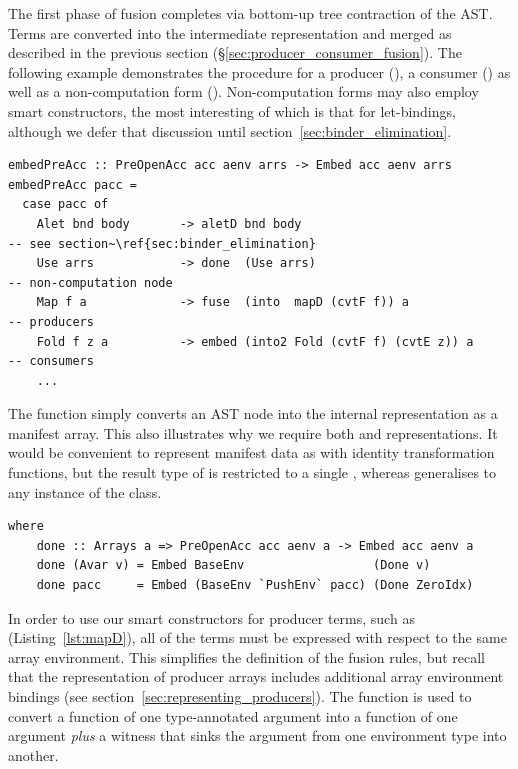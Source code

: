 The first phase of fusion completes via bottom-up tree contraction of the
AST. Terms are converted into the intermediate
representation and merged as described in the previous section
(\S\ref{sec:producer_consumer_fusion}). The following example demonstrates the
procedure for a producer (), a consumer () as well as a
non-computation form (). Non-computation forms may also employ smart
constructors, the most interesting of which is that for let-bindings, although
we defer that discussion until section~\ref{sec:binder_elimination}.
%
\begin{lstlisting}[style=haskell
    ,name=embedPreAcc
    ,label=lst:embedPreAcc
    ,caption={[Producer fusion via bottom-up contraction of the AST]}]
embedPreAcc :: PreOpenAcc acc aenv arrs -> Embed acc aenv arrs
embedPreAcc pacc =
  case pacc of
    Alet bnd body       -> aletD bnd body                               -- see section~\ref{sec:binder_elimination}
    Use arrs            -> done  (Use arrs)                             -- non-computation node
    Map f a             -> fuse  (into  mapD (cvtF f)) a                -- producers
    Fold f z a          -> embed (into2 Fold (cvtF f) (cvtE z)) a       -- consumers
    ...
\end{lstlisting}

The function  simply converts an AST node into the internal
representation as a manifest array. This also illustrates why we require both
 and  representations. It would be convenient to represent
manifest data as  with identity transformation functions, but the
result type of  is restricted to a single , whereas
 generalises to any instance of the  class.

\begin{lstlisting}[style=haskell,name=embedPreAcc]
  where
    done :: Arrays a => PreOpenAcc acc aenv a -> Embed acc aenv a
    done (Avar v) = Embed BaseEnv                  (Done v)
    done pacc     = Embed (BaseEnv `PushEnv` pacc) (Done ZeroIdx)
\end{lstlisting}

In order to use our smart constructors for producer terms, such as 
(Listing~\ref{lst:mapD}), all of the terms must be expressed with respect to the
same array environment. This simplifies the definition of the fusion rules, but
recall that the representation of producer arrays includes additional array
environment bindings (see section~\ref{sec:representing_producers}). The
function  is used to convert a function of one type-annotated
argument into a function of one argument \emph{plus} a witness that sinks the
argument from one environment type into another.

